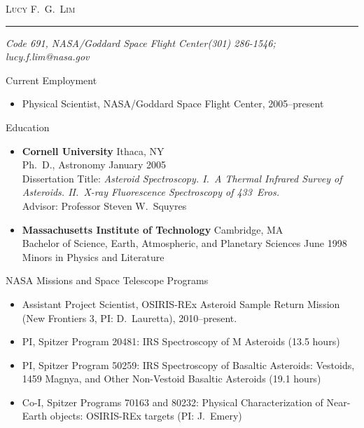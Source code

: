 \documentclass[11pt,oneside]{article}
\makeatletter
\newcommand{\name}{Lucy F.~G.~Lim}
\newcommand{\addr}{Code 691, NASA/Goddard Space Flight Center}
\newcommand{\phone}{(301) 286-1546}
\newcommand{\email}{lucy.f.lim@nasa.gov}
\newcommand{\bigname}[1]{
	\begin{center}\selectfont\Huge\scshape#1\end{center}}
\newenvironment{ressection}[1]{
	\vspace{4pt}
	{\Large#1}
	\begin{itemize}
	\vspace{3pt}
}{
	\end{itemize}
}
\newcommand{\resitem}[1]{
	\vspace{-4pt}
	\item \begin{flushleft} #1 \end{flushleft}
}
\newcommand{\ressubitem}[1]{
	\vspace{-1pt}
	\item \begin{flushleft} #1 \end{flushleft}
}
\newcommand{\resbigitem}[3]{
	\vspace{-5pt}
	\item
	\textbf{#1} \hfill #2 \\
	\textrm{#3}
}
\newenvironment{ressubsec}[3]{
	\resbigitem{#1}{#2}{#3}
	\vspace{-2pt}
}{
}
\makeatother
\begin{document}
\bigname{\name}

\vspace{-8pt} \rule{\textwidth}{1pt}

\vspace{-1pt} {\small\itshape \addr \hfill \phone; \email}

\vspace{8 pt}


\begin{ressection}{Current Employment}
 \resitem{Physical Scientist, NASA/Goddard Space Flight Center, 2005--present}
\end{ressection}

\begin{ressection}{Education}

  \begin{ressubsec}{Cornell University}{Ithaca, NY}
                   {Ph.~D., Astronomy \hfill January 2005
                   \\ Dissertation
                   Title: {\it Asteroid Spectroscopy. I.~A Thermal
                   Infrared Survey of Asteroids.  II.~X-ray
                   Fluorescence Spectroscopy of 433~Eros.} \\
                   Advisor:  Professor Steven W.\ Squyres}
  \end{ressubsec}

  \begin{ressubsec}{Massachusetts Institute of Technology}{Cambridge, MA}
                 {Bachelor of Science, Earth, Atmospheric,
                  and Planetary Sciences \hfill June 1998 \\ Minors
                  in Physics and Literature}
  \end{ressubsec}

\end{ressection}


\begin{ressection}{NASA Missions and Space Telescope Programs}

  \resitem{Assistant Project Scientist, OSIRIS-REx 
Asteroid Sample Return Mission
(New Frontiers 3, PI: D.\ Lauretta), 2010--present.}

  \resitem{PI, Spitzer Program 20481:  IRS Spectroscopy of M Asteroids (13.5 hours)}

  \resitem{PI, Spitzer Program 50259: IRS Spectroscopy of Basaltic
    Asteroids: Vestoids, 1459 Magnya, and Other Non-Vestoid Basaltic
    Asteroids (19.1 hours)}

  \resitem{Co-I, Spitzer Programs 70163 and 80232: Physical Characterization of 
Near-Earth objects:  OSIRIS-REx targets
(PI: J.\ Emery)}

\end{ressection}
\end{document}

